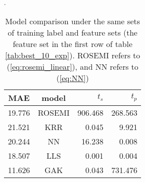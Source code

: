 \documentclass[12pt]{article}
\begin{document}
\begin{table}[H]
	\centering
	\caption{Model comparison under the same sets of training label and feature sets (the feature set in the first row of table \ref{tab:best_10_exp}). ROSEMI refers to (\ref{eq:rosemi_linear}), and NN refers to (\ref{eq:NN})}.
	\begin{tabular}{|c|c|r|r|}
		\hline
		\textbf{MAE}	& \textbf{model}	& $t_s$	& $t_p$	\\ \hline
		19.776	& ROSEMI	& 906.468	& 268.563	\\ \hline
		21.521	& KRR	& 0.045	& 9.921	\\ \hline
		20.244	& NN	& 16.238	& 0.008	\\ \hline
		18.507	& LLS	& 0.001	& 0.004	\\ \hline
		11.626	& GAK	& 0.043	& 731.476	\\ \hline
	\end{tabular}
	\label{tab:model_comparison}
\end{table}
\end{document}
